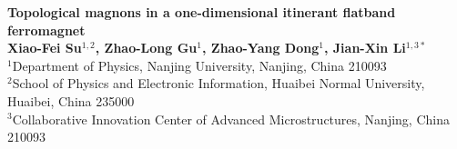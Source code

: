 \documentclass[a0,portrait]{a0poster}
\begin{document}


\begin{minipage}[c]{0.88\linewidth}
\begin{center}
\Huge \color{MidnightBlue} \textbf{Topological magnons in a one-dimensional itinerant flatband ferromagnet}
\color{Black}\\ %
\Large \textbf{Xiao-Fei Su$^{1,2}$, Zhao-Long Gu$^1$, Zhao-Yang Dong$^1$, Jian-Xin Li$^{1,3*}$}\\[0.5cm] %
\Large $^1$Department of Physics, Nanjing University, Nanjing, China 210093 \\[0.4cm]
\Large $^2$School of Physics and Electronic Information, Huaibei Normal University, Huaibei, China 235000\\[0.4cm]
\Large $^3$Collaborative Innovation Center of Advanced Microstructures, Nanjing, China 210093 \\[0.4cm] %

\end{center}
\end{minipage}
%
\end{document}
